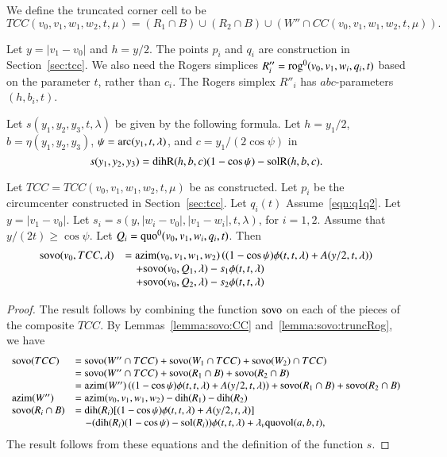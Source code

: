\begin{definition} We define the truncated corner cell
to be
$$
TCC(v_0,v_1,w_1,w_2,t,\mu) =
(R_1\cap B)\cup (R_2\cap B) \cup (W''\cap CC(v_0,v_1,w_1,w_2,t,\mu)).
$$
\end{definition}

Let $y=|v_1-v_0|$ and $h=y/2$.
The points $p_i$ and
 $q_i$ are construction in Section~\ref{sec:tcc}.
We also need the Rogers simplices 
$R''_i= {\operatorname{rog}}^0(v_0,v_1,w_i,q_i,t)$ based on the parameter
$t$, rather than $c_i$.  The Rogers simplex $R''_i$
has $abc$-parameters
$(h,b_i,t)$.  

Let $s(y_1,y_2,y_3,t,\lambda)$ be given by the following formula.
Let $h = y_1/2$, $b = \eta(y_1,y_2,y_3)$, $\psi = \operatorname{arc}(y_1,t,\lambda)$,
and $c = y_1/(2\cos\psi)$ in
  $$
  s(y_1,y_2,y_3) = {\operatorname{dihR}}(h,b,c) (1-\cos\psi) - {\operatorname{solR}}(h,b,c).
  $$


\begin{lemma}\label{lemma:tcc}  
Let $TCC=TCC(v_0,v_1,w_1,w_2,t,\mu)$ be as constructed.
Let $p_i$ be the circumcenter constructed in Section~\ref{sec:tcc}.
Let $q_i(t)$
Assume~\ref{eqn:q1q2}.  Let $y = |v_1-v_0|$.  
Let $s_i = s(y,|w_i-v_0|,|v_1-w_i|,t,\lambda)$, for $i=1,2$.
Assume that
$y/(2t) \ge \cos\psi$.  
Let $Q_i = {\operatorname{quo}}^0(v_0,v_1,w_i,q_i,t)$.  Then
  $$
  \begin{array}{lll}
  {\operatorname{sovo}}(v_0,TCC,\lambda) &= 
  {\operatorname{azim}}(v_0,v_1,w_1,w_2) \left((1-\cos\psi)\phi(t,t,\lambda)+
    A(y/2,t,\lambda)\right) \\
    &\quad + {\operatorname{sovo}}(v_0,Q_1,\lambda) - s_1\phi(t,t,\lambda) \\
    &\quad + {\operatorname{sovo}}(v_0,Q_2,\lambda) - s_2\phi(t,t,\lambda) \\
  \end{array}
  $$
\end{lemma}

\begin{proof}  The result follows by combining the function
${\operatorname{sovo}}$ on each of the pieces of the composite $TCC$.
By Lemmas~\ref{lemma:sovo:CC} and~\ref{lemma:sovo:truncRog},  
we have
$$
\begin{array}{lll}
  {\operatorname{sovo}}(TCC) &= {\operatorname{sovo}}(W''\cap TCC) + {\operatorname{sovo}}(W_1\cap TCC)
  + {\operatorname{sovo}}(W_2)\cap TCC)\\
  &={\operatorname{sovo}}(W''\cap TCC) + {\operatorname{sovo}}(R_1\cap B)
  + {\operatorname{sovo}}(R_2\cap B)\\
  &= {\operatorname{azim}}(W'') \left((1-\cos\psi)\phi(t,t,\lambda)+
    A(y/2,t,\lambda)\right) 
   + {\operatorname{sovo}}(R_1\cap B)
  + {\operatorname{sovo}}(R_2\cap B)\\
  {\operatorname{azim}}(W'') &= {\operatorname{azim}}(v_0,v_1,w_1,w_2)-\operatorname{dih}(R_1)-\operatorname{dih}(R_2)\\
  {\operatorname{sovo}}(R_i\cap B) &= \operatorname{dih}(R_i) [(1-\cos\psi)\phi(t,t,\lambda)+A(y/2,t,\lambda)]\\
   &\quad -(\operatorname{dih}(R_i) (1-\cos\psi) - \operatorname{sol}(R_i)) \phi(t,t,\lambda) + 
   \lambda_v {\operatorname{quovol}}(a,b,t),
\end{array}
$$
The result follows from these equations and the definition of
the function $s$.
\end{proof}

